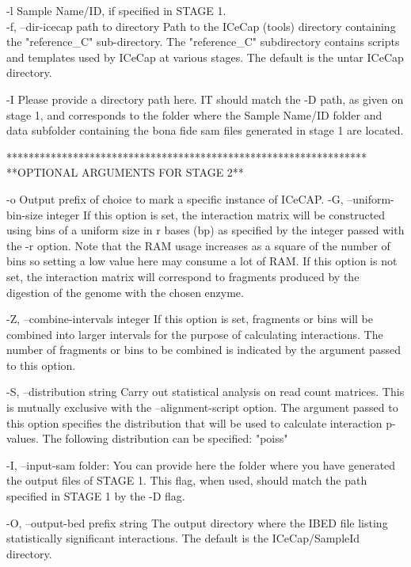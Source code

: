\documentclass[10pt,a4paper]{article}
\begin{document}
        -l Sample Name/ID, if specified in STAGE 1.\\

        -f, --dir-icecap path to directory     Path to the ICeCap (tools) directory containing the "reference\_C" sub-directory.  The "reference\_C" subdirectory contains scripts and templates used by ICeCap at various stages.  The default is the untar ICeCap directory.

        -I Please provide a directory path here. IT should match the -D path, as given on stage 1, and corresponds to the folder where the Sample Name/ID folder and data subfolder containing the bona fide sam files generated in stage 1 are located. 

*****************************************************************\\
**OPTIONAL ARGUMENTS FOR STAGE 2**

      -o  Output prefix of choice to mark a specific instance of ICeCAP.
      -G, --uniform-bin-size integer    If this option is set, the interaction matrix will be constructed using bins of a uniform size in r bases (bp) as specified by the integer passed with the -r option.  Note that the RAM usage increases as a square of the number of bins so setting a low value here may consume a lot of RAM.  If this option is not set, the interaction matrix will correspond to fragments produced by the digestion of the genome with the chosen enzyme.

      -Z, --combine-intervals integer    If this option is set, fragments or bins will be combined into larger intervals for the purpose of calculating interactions.  The number of fragments or bins to be combined is indicated by the argument passed to this option.


      -S, --distribution string    Carry out statistical analysis on read count matrices.  This is mutually exclusive with the --alignment-script option.
                                                      The argument passed to this option specifies the distribution that will be used to calculate interaction p-values.
                                                      The following distribution can be specified:
                                                      "poiss" 

        -I, --input-sam folder: You can provide here the folder where you have generated the output files of STAGE 1. This flag, when used, should match the path specified in STAGE 1 by the        -D flag.

        -O, --output-bed prefix string    The output directory where the IBED file listing statistically significant interactions. The default is the ICeCap/SampleId directory.
\end{document}
